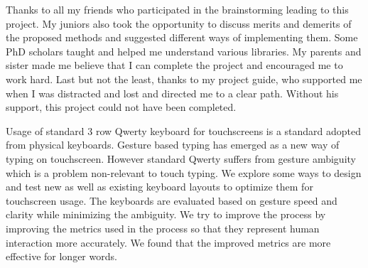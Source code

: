 \documentclass[MTech]{iitmdiss}
\begin{document}
Thanks to all my friends who participated in the brainstorming leading to this project. My juniors also took the opportunity to discuss merits and demerits of the proposed methods and suggested different ways of implementing them. Some PhD scholars taught and helped me understand various libraries. My parents and sister made me believe that I can complete the project and encouraged me to work hard. Last but not the least, thanks to my project guide, who supported me when I was distracted and lost and directed me to a clear path. Without his support, this project could not have been completed.


\abstract
\noindent Usage of standard 3 row Qwerty keyboard for touchscreens is a standard adopted from physical keyboards. Gesture based typing has emerged as a new way of typing on touchscreen. However standard Qwerty suffers from gesture ambiguity which is a problem non-relevant to touch typing. We explore some ways to design and test new as well as existing keyboard layouts to optimize them for touchscreen usage. The keyboards are evaluated based on gesture speed and clarity while minimizing the ambiguity. We try to improve the process by improving the metrics used in the process so that they represent human interaction more accurately. We found that the improved metrics are more effective for longer words.

\pagebreak


\begin{singlespace}
\tableofcontents
\thispagestyle{empty}

\listoffigures
{}
\end{singlespace}



\end{document}
